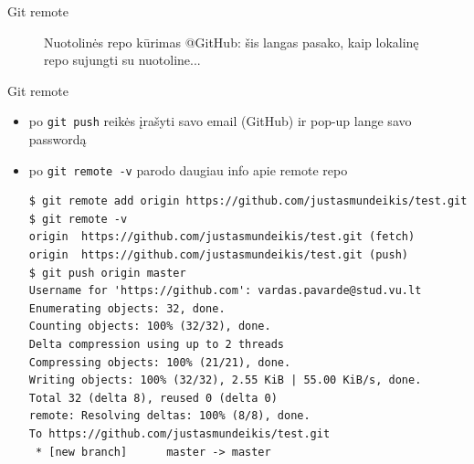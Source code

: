 \documentclass[11pt,xcolor=table]{beamer}
\begin{document}
\begin{frame}{Git remote}
\begin{figure}
\caption{Nuotolinės repo kūrimas @GitHub: šis langas pasako, kaip lokalinę repo sujungti su nuotoline...}
\end{figure}
\end{frame}


\begin{frame}[fragile]{Git remote}
\begin{itemize}
\item po \colorbox{listinggray}{\lstinline|git push|} reikės įrašyti savo email (GitHub) ir pop-up lange savo passwordą
\item po \colorbox{listinggray}{\lstinline|git remote -v|} parodo daugiau info apie remote repo
\begin{lstlisting}
$ git remote add origin https://github.com/justasmundeikis/test.git
$ git remote -v
origin  https://github.com/justasmundeikis/test.git (fetch)
origin  https://github.com/justasmundeikis/test.git (push)
$ git push origin master
Username for 'https://github.com': vardas.pavarde@stud.vu.lt
Enumerating objects: 32, done.
Counting objects: 100% (32/32), done.
Delta compression using up to 2 threads
Compressing objects: 100% (21/21), done.
Writing objects: 100% (32/32), 2.55 KiB | 55.00 KiB/s, done.
Total 32 (delta 8), reused 0 (delta 0)
remote: Resolving deltas: 100% (8/8), done.
To https://github.com/justasmundeikis/test.git
 * [new branch]      master -> master
\end{lstlisting}
\end{itemize}
\end{frame}
\end{document}
